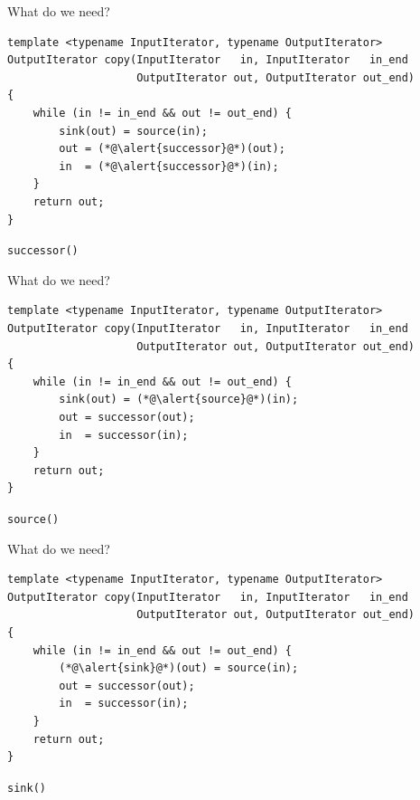 \documentclass[aspectratio=169]{beamer}
\begin{document}

\begin{frame}[fragile]{What do we need?}
  \footnotesize
\begin{lstlisting}
template <typename InputIterator, typename OutputIterator>
OutputIterator copy(InputIterator   in, InputIterator   in_end
                    OutputIterator out, OutputIterator out_end)
{
    while (in != in_end && out != out_end) {
        sink(out) = source(in);
        out = (*@\alert{successor}@*)(out);
        in  = (*@\alert{successor}@*)(in);
    }
    return out;
}
\end{lstlisting}
  \begin{center}
    \Large \texttt{successor()}
  \end{center}
\end{frame}


\begin{frame}[fragile]{What do we need?}
  \footnotesize
\begin{lstlisting}
template <typename InputIterator, typename OutputIterator>
OutputIterator copy(InputIterator   in, InputIterator   in_end
                    OutputIterator out, OutputIterator out_end)
{
    while (in != in_end && out != out_end) {
        sink(out) = (*@\alert{source}@*)(in);
        out = successor(out);
        in  = successor(in);
    }
    return out;
}
\end{lstlisting}
  \begin{center}
    \Large \texttt{source()}
  \end{center}
\end{frame}


\begin{frame}[fragile]{What do we need?}
  \footnotesize
\begin{lstlisting}
template <typename InputIterator, typename OutputIterator>
OutputIterator copy(InputIterator   in, InputIterator   in_end
                    OutputIterator out, OutputIterator out_end)
{
    while (in != in_end && out != out_end) {
        (*@\alert{sink}@*)(out) = source(in);
        out = successor(out);
        in  = successor(in);
    }
    return out;
}
\end{lstlisting}
  \begin{center}
    \Large \texttt{sink()}
  \end{center}
\end{frame}
\end{document}
